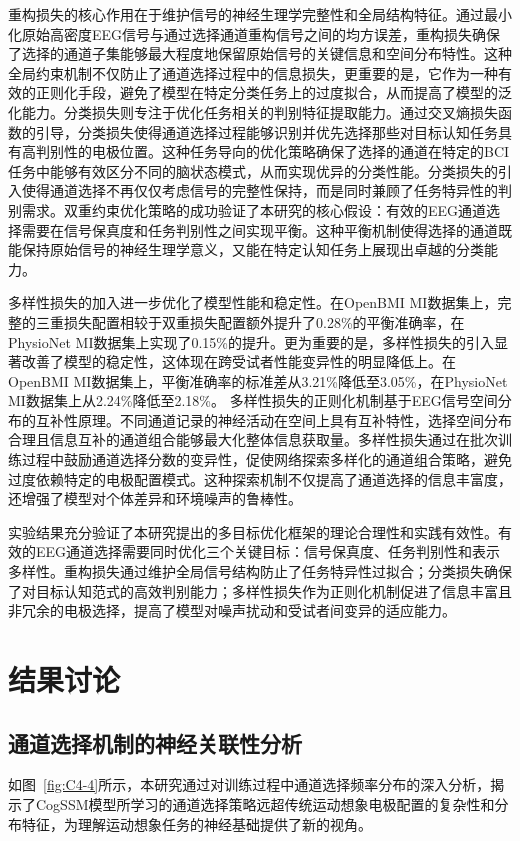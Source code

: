 重构损失的核心作用在于维护信号的神经生理学完整性和全局结构特征。通过最小化原始高密度EEG信号与通过选择通道重构信号之间的均方误差，重构损失确保了选择的通道子集能够最大程度地保留原始信号的关键信息和空间分布特性。这种全局约束机制不仅防止了通道选择过程中的信息损失，更重要的是，它作为一种有效的正则化手段，避免了模型在特定分类任务上的过度拟合，从而提高了模型的泛化能力。分类损失则专注于优化任务相关的判别特征提取能力。通过交叉熵损失函数的引导，分类损失使得通道选择过程能够识别并优先选择那些对目标认知任务具有高判别性的电极位置。这种任务导向的优化策略确保了选择的通道在特定的BCI任务中能够有效区分不同的脑状态模式，从而实现优异的分类性能。分类损失的引入使得通道选择不再仅仅考虑信号的完整性保持，而是同时兼顾了任务特异性的判别需求。双重约束优化策略的成功验证了本研究的核心假设：有效的EEG通道选择需要在信号保真度和任务判别性之间实现平衡。这种平衡机制使得选择的通道既能保持原始信号的神经生理学意义，又能在特定认知任务上展现出卓越的分类能力。

多样性损失的加入进一步优化了模型性能和稳定性。在OpenBMI MI数据集上，完整的三重损失配置相较于双重损失配置额外提升了0.28\%的平衡准确率，在PhysioNet MI数据集上实现了0.15\%的提升。更为重要的是，多样性损失的引入显著改善了模型的稳定性，这体现在跨受试者性能变异性的明显降低上。在OpenBMI MI数据集上，平衡准确率的标准差从3.21\%降低至3.05\%，在PhysioNet MI数据集上从2.24\%降低至2.18\%。
多样性损失的正则化机制基于EEG信号空间分布的互补性原理。不同通道记录的神经活动在空间上具有互补特性，选择空间分布合理且信息互补的通道组合能够最大化整体信息获取量。多样性损失通过在批次训练过程中鼓励通道选择分数的变异性，促使网络探索多样化的通道组合策略，避免过度依赖特定的电极配置模式。这种探索机制不仅提高了通道选择的信息丰富度，还增强了模型对个体差异和环境噪声的鲁棒性。

实验结果充分验证了本研究提出的多目标优化框架的理论合理性和实践有效性。有效的EEG通道选择需要同时优化三个关键目标：信号保真度、任务判别性和表示多样性。重构损失通过维护全局信号结构防止了任务特异性过拟合；分类损失确保了对目标认知范式的高效判别能力；多样性损失作为正则化机制促进了信息丰富且非冗余的电极选择，提高了模型对噪声扰动和受试者间变异的适应能力。


\section{结果讨论}
\label{sec:discussion}

\subsection{通道选择机制的神经关联性分析}
如图~\ref{fig:C4-4}所示，本研究通过对训练过程中通道选择频率分布的深入分析，揭示了CogSSM模型所学习的通道选择策略远超传统运动想象电极配置的复杂性和分布特征，为理解运动想象任务的神经基础提供了新的视角。

